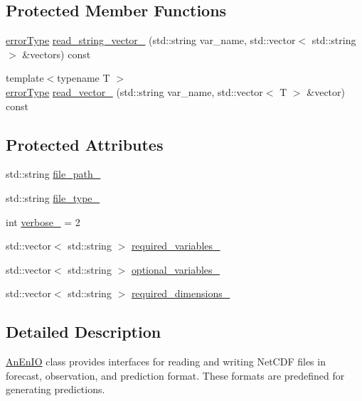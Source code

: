 \subsection*{Protected Member Functions}
\begin{DoxyCompactItemize}
\item 
\mbox{\hyperlink{class_an_en_i_o_aa56bc1ec6610b86db4349bce20f9ead0}{error\+Type}} \mbox{\hyperlink{class_an_en_i_o_a17e7a4c520675c23b01cbd65c7ffe1d5}{read\+\_\+string\+\_\+vector\+\_\+}} (std\+::string var\+\_\+name, std\+::vector$<$ std\+::string $>$ \&vectors) const
\item 
{\footnotesize template$<$typename T $>$ }\\\mbox{\hyperlink{class_an_en_i_o_aa56bc1ec6610b86db4349bce20f9ead0}{error\+Type}} \mbox{\hyperlink{class_an_en_i_o_a3c3a3f86f90ea7610e086d371414d54f}{read\+\_\+vector\+\_\+}} (std\+::string var\+\_\+name, std\+::vector$<$ T $>$ \&vector) const
\end{DoxyCompactItemize}
\subsection*{Protected Attributes}
\begin{DoxyCompactItemize}
\item 
std\+::string \mbox{\hyperlink{class_an_en_i_o_ab892e06ca18be5e0c442c9e882e4475f}{file\+\_\+path\+\_\+}}
\item 
std\+::string \mbox{\hyperlink{class_an_en_i_o_addbfb455f641a394c14907163874d8fe}{file\+\_\+type\+\_\+}}
\item 
int \mbox{\hyperlink{class_an_en_i_o_a4f6abd007730e4a8f54d57cc3572bd9e}{verbose\+\_\+}} = 2
\item 
std\+::vector$<$ std\+::string $>$ \mbox{\hyperlink{class_an_en_i_o_a119dcb81d3811547f0e37d6c3752f0a7}{required\+\_\+variables\+\_\+}}
\item 
std\+::vector$<$ std\+::string $>$ \mbox{\hyperlink{class_an_en_i_o_a43f82ffbafbbda7ab8c9471d0bce70df}{optional\+\_\+variables\+\_\+}}
\item 
std\+::vector$<$ std\+::string $>$ \mbox{\hyperlink{class_an_en_i_o_adf42061631c78508bde00de7d22a65b4}{required\+\_\+dimensions\+\_\+}}
\end{DoxyCompactItemize}


\subsection{Detailed Description}
\mbox{\hyperlink{class_an_en_i_o}{An\+En\+IO}} class provides interfaces for reading and writing Net\+C\+DF files in forecast, observation, and prediction format. These formats are predefined for generating predictions. 

